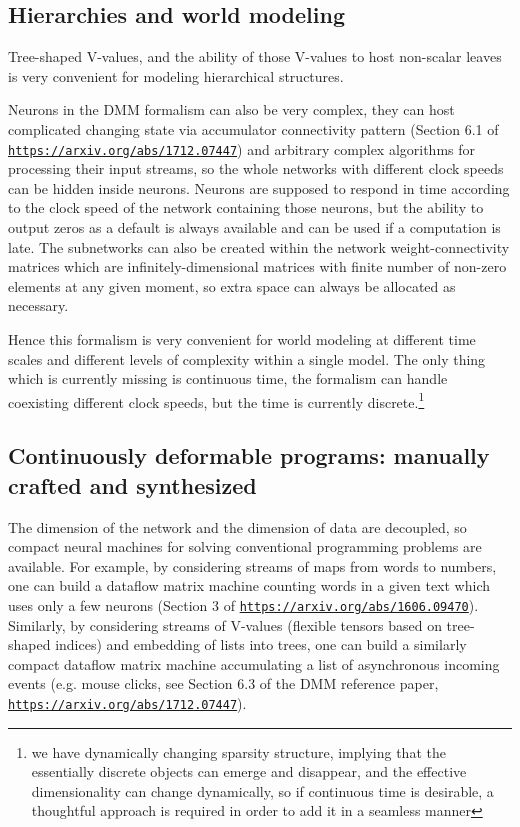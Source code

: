 \documentclass{article}
\begin{document}
\subsection{Hierarchies and world modeling}

Tree-shaped V-values, and the ability of those V-values to host non-scalar leaves is very convenient
for modeling hierarchical structures. 

Neurons in the DMM formalism can also be very complex,
they can host complicated changing state via accumulator connectivity pattern
(Section 6.1 of \href{https://arxiv.org/abs/1712.07447}{\tt https://arxiv.org/abs/1712.07447}) and
arbitrary complex algorithms for processing their input streams, so the whole networks with different
clock speeds can be hidden inside neurons. Neurons are supposed to respond in time according to the
clock speed of the network containing those neurons, but the ability to output zeros as a default is always
available and can be used if a computation is late. The subnetworks can also be created within the
network weight-connectivity matrices which are infinitely-dimensional matrices with finite number of non-zero elements at any
given moment, so extra space can always be allocated as necessary.

Hence this formalism is very convenient for world modeling at different time scales and different levels
of complexity within a single model. The only thing which is currently missing is continuous time,
the formalism can handle coexisting different clock speeds, but the time is currently discrete.\footnote{we have dynamically changing
sparsity structure, implying that the essentially discrete objects can emerge and disappear, and the effective
dimensionality can change dynamically, so if continuous time is desirable, a thoughtful approach
is required in order to add it in a seamless manner}

\subsection{Continuously deformable programs: manually crafted and synthesized}

The dimension of the network and the dimension
of data are decoupled, so compact neural machines for solving conventional programming problems are available.
For example, by considering streams of maps from words to numbers, one can build a dataflow matrix machine
counting words in a given text which uses only a few neurons 
(Section 3 of \href{https://arxiv.org/abs/1606.09470}{\tt https://arxiv.org/abs/1606.09470}).
Similarly, by considering streams of V-values  (flexible tensors based on tree-shaped indices) and embedding
of lists into trees, one can build a similarly compact dataflow matrix machine
accumulating a list of asynchronous incoming events
(e.g. mouse clicks, see Section 6.3 of the DMM reference paper, \href{https://arxiv.org/abs/1712.07447}{\tt https://arxiv.org/abs/1712.07447}). 
\end{document}
